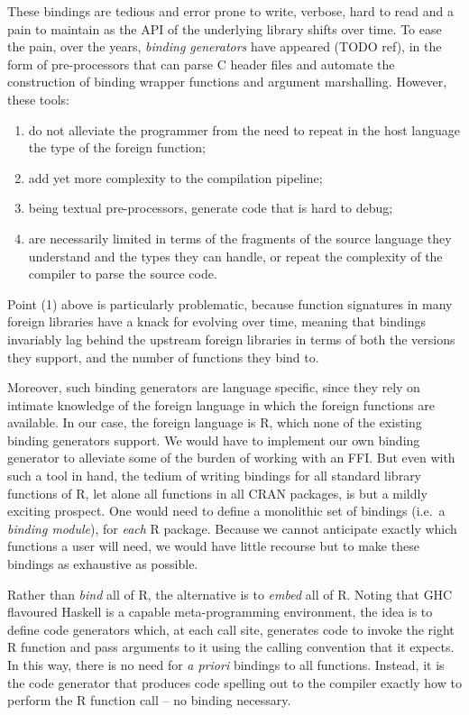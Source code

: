 \documentclass[preprint,authoryear]{sigplanconf}
\begin{document}
These bindings are tedious and error prone to write, verbose, hard to
read and a pain to maintain as the API of the underlying library
shifts over time. To ease the pain, over the years, {\em binding
  generators} have appeared (TODO ref), in the form of pre-processors
that can parse C header files and automate the construction of binding
wrapper functions and argument marshalling. However, these tools:
\begin{enumerate}
\item do not alleviate the programmer from the need to repeat in the
  host language the type of the foreign function;
\item add yet more complexity to the compilation pipeline;
\item being textual pre-processors, generate code that is hard to
  debug;
\item are necessarily limited in terms of the fragments of the source
  language they understand and the types they can handle, or repeat
  the complexity of the compiler to parse the source code.
\end{enumerate}
Point (1) above is particularly problematic, because function
signatures in many foreign libraries have a knack for evolving over
time, meaning that bindings invariably lag behind the upstream foreign
libraries in terms of both the versions they support, and the number
of functions they bind to.

Moreover, such binding generators are language specific, since they
rely on intimate knowledge of the foreign language in which the
foreign functions are available. In our case, the foreign language is
R, which none of the existing binding generators support. We would
have to implement our own binding generator to alleviate some of the
burden of working with an FFI. But even with such a tool in hand, the
tedium of writing bindings for all standard library functions of R,
let alone all functions in all CRAN packages, is but a mildly exciting
prospect. One would need to define a monolithic set of bindings
(i.e.\ a {\em binding module}), for {\em each} R package. Because we
cannot anticipate exactly which functions a user will need, we would
have little recourse but to make these bindings as exhaustive as
possible.

Rather than {\em bind} all of R, the alternative is to {\em embed} all
of R. Noting that GHC flavoured Haskell is a capable meta-programming
environment, the idea is to define code generators which, at each call
site, generates code to invoke the right R function and pass arguments
to it using the calling convention that it expects. In this way, there
is no need for {\em a priori} bindings to all functions. Instead, it
is the code generator that produces code spelling out to the compiler
exactly how to perform the R function call -- no binding necessary.
\end{document}
